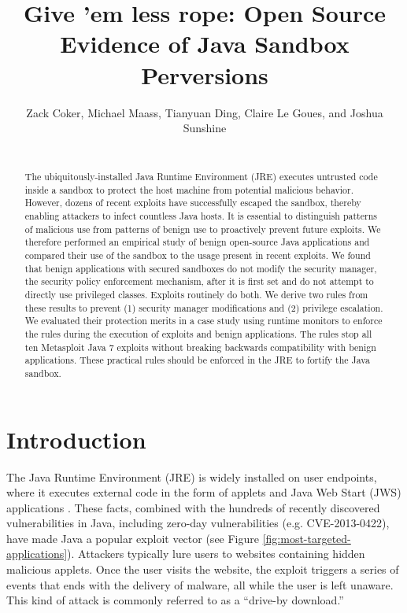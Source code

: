 \documentclass{sig-alternate}
\begin{document}

\title{Give 'em less rope: Open Source Evidence of Java Sandbox Perversions}

\author{\alignauthor Zack Coker, Michael Maass, Tianyuan Ding, Claire Le Goues, and Joshua Sunshine \\
 \\
} 

\maketitle
\thispagestyle{plain} 
\pagestyle{plain}
\begin{abstract}
The ubiquitously-installed Java Runtime Environment (JRE) executes
untrusted code inside a sandbox to protect the host machine from potential
malicious behavior. However, dozens of recent exploits have successfully
escaped the sandbox, thereby enabling attackers to infect countless
Java hosts. It is essential to distinguish patterns of malicious use
from patterns of benign use to proactively prevent future exploits.
We therefore performed an empirical study of benign open-source Java
applications and compared their use of the sandbox to the usage present
in recent exploits. We found that benign applications with secured
sandboxes do not modify the security manager, the security policy
enforcement mechanism, after it is first set and do not attempt to
directly use privileged classes. Exploits routinely do both. We derive two rules from these results to prevent (1) security manager modifications and (2) privilege escalation. We evaluated their protection merits in a case study using runtime monitors to enforce the rules during the execution of exploits and benign applications. The rules stop all ten Metasploit Java 7 exploits without breaking backwards compatibility with benign applications. These practical rules should be enforced in the JRE to fortify the Java sandbox.
\end{abstract}

\section{Introduction}

The Java Runtime Environment (JRE) is widely installed on user endpoints,
where it executes external code in the form of applets and Java Web Start (JWS) \cite{_java_web_start} applications \cite{gong1997going,gong2003inside}.
These facts, combined with the hundreds of recently discovered vulnerabilities
in Java, including zero-day vulnerabilities (e.g. CVE-2013-0422),
have made Java a popular exploit vector (see Figure \ref{fig:most-targeted-applications}).
Attackers typically lure users to websites containing hidden malicious
applets. Once the user visits the website, the exploit triggers a
series of events that ends with the delivery of malware, all while
the user is left unaware. This kind of attack is commonly referred
to as a ``drive-by download.''
\end{document}
